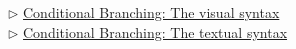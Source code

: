 \begin{center} {$\triangleright$ \hyperlink{conBran vis}{Conditional Branching: The visual syntax}}%
\\ \vspace{0.5cm}
 {$\triangleright$ \hyperlink{conBran tex}{Conditional Branching: The textual syntax}}\end{center} 




